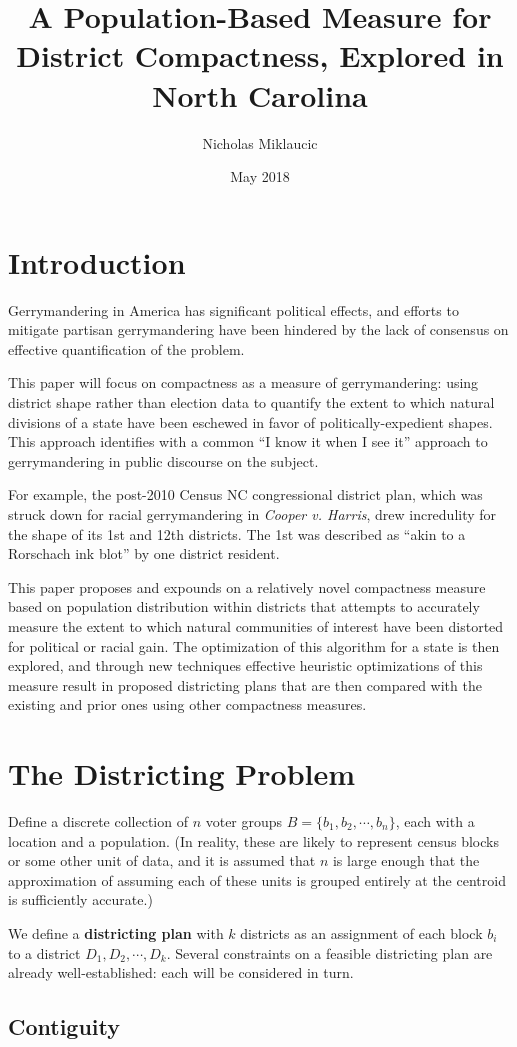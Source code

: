 \documentclass[12pt, draft]{article}
\begin{document}
\title{A Population-Based Measure for District Compactness, Explored in North Carolina}
\author{Nicholas Miklaucic}
\date{May 2018}
\maketitle

\section{Introduction}
Gerrymandering in America has significant political effects, and efforts to mitigate partisan
gerrymandering have been hindered by the lack of consensus on effective quantification of the
problem.

This paper will focus on compactness as a measure of gerrymandering: using district shape rather
than election data to quantify the extent to which natural divisions of a state have been eschewed
in favor of politically-expedient shapes. This approach identifies with a common ``I know it when I
see it'' approach to gerrymandering in public discourse on the subject.

For example, the post-2010 Census NC congressional district plan, which was struck down for racial
gerrymandering in \textit{Cooper v. Harris}, drew incredulity for the shape of its 1st and 12th
districts. The 1st was described as ``akin to a Rorschach ink blot'' by one district resident.

This paper proposes and expounds on a relatively novel compactness measure based on population
distribution within districts that attempts to accurately measure the extent to which natural
communities of interest have been distorted for political or racial gain. The optimization of this
algorithm for a state is then explored, and through new techniques effective heuristic optimizations
of this measure result in proposed districting plans that are then compared with the existing and
prior ones using other compactness measures.

\section{The Districting Problem}
Define a discrete collection of $n$ voter groups $B = \{b_1, b_2, \cdots, b_n\}$, each with a location
and a population. (In reality, these are likely to represent census blocks or some other unit of
data, and it is assumed that $n$ is large enough that the approximation of assuming each of these
units is grouped entirely at the centroid is sufficiently accurate.)

We define a \textbf{districting plan} with $k$ districts as an assignment of each block $b_i$ to a
district $D_1, D_2, \cdots, D_k$. Several constraints on a feasible districting plan are already
well-established: each will be considered in turn.

\subsection{Contiguity}
\end{document}
